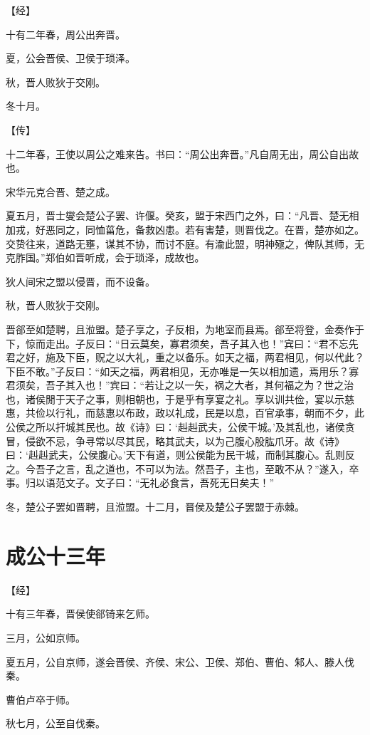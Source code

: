 \documentclass[a4paper,12pt,UTF8,twoside]{ctexbook}
\begin{document}
【经】

十有二年春，周公出奔晋。

夏，公会晋侯、卫侯于琐泽。

秋，晋人败狄于交刚。

冬十月。

【传】

十二年春，王使以周公之难来告。书曰：“周公出奔晋。”凡自周无出，周公自出故也。

宋华元克合晋、楚之成。

夏五月，晋士燮会楚公子罢、许偃。癸亥，盟于宋西门之外，曰：“凡晋、楚无相加戎，好恶同之，同恤菑危，备救凶患。若有害楚，则晋伐之。在晋，楚亦如之。交贽往来，道路无壅，谋其不协，而讨不庭。有渝此盟，明神殛之，俾队其师，无克胙国。”郑伯如晋听成，会于琐泽，成故也。

狄人间宋之盟以侵晋，而不设备。

秋，晋人败狄于交刚。

晋郤至如楚聘，且涖盟。楚子享之，子反相，为地室而县焉。郤至将登，金奏作于下，惊而走出。子反曰：“日云莫矣，寡君须矣，吾子其入也！”宾曰：“君不忘先君之好，施及下臣，贶之以大礼，重之以备乐。如天之福，两君相见，何以代此？下臣不敢。”子反曰：“如天之福，两君相见，无亦唯是一矢以相加遗，焉用乐？寡君须矣，吾子其入也！”宾曰：“若让之以一矢，祸之大者，其何福之为？世之治也，诸侯閒于天子之事，则相朝也，于是乎有享宴之礼。享以训共俭，宴以示慈惠，共俭以行礼，而慈惠以布政，政以礼成，民是以息，百官承事，朝而不夕，此公侯之所以扞城其民也。故《诗》曰：‘赳赳武夫，公侯干城。’及其乱也，诸侯贪冒，侵欲不忌，争寻常以尽其民，略其武夫，以为己腹心股肱爪牙。故《诗》曰：‘赳赳武夫，公侯腹心。’天下有道，则公侯能为民干城，而制其腹心。乱则反之。今吾子之言，乱之道也，不可以为法。然吾子，主也，至敢不从？”遂入，卒事。归以语范文子。文子曰：“无礼必食言，吾死无日矣夫！”

冬，楚公子罢如晋聘，且涖盟。十二月，晋侯及楚公子罢盟于赤棘。


\section{成公十三年}



【经】

十有三年春，晋侯使郤锜来乞师。

三月，公如京师。

夏五月，公自京师，遂会晋侯、齐侯、宋公、卫侯、郑伯、曹伯、邾人、滕人伐秦。

曹伯卢卒于师。

秋七月，公至自伐秦。
\end{document}
